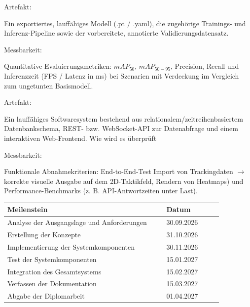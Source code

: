 Artefakt:

Ein exportiertes, lauffähiges Modell 
(.pt / .yaml), die zugehörige Trainings- und Inferenz-Pipeline 
sowie der vorbereitete, annotierte Validierungsdatensatz. 

Messbarkeit: 

Quantitative Evaluierungsmetriken: $mAP_{50}$, $mAP_{50-95}$, 
Precision, Recall und Inferenzzeit (FPS / Latenz in ms) bei 
Szenarien mit Verdeckung im Vergleich zum ungetunten Basismodell.

Artefakt:

Ein lauffähiges Softwaresystem bestehend aus 
relationalem/zeitreihenbasiertem Datenbankschema, REST- bzw. 
WebSocket-API zur Datenabfrage und einem interaktiven Web-Frontend.
Wie wird es überprüft 

Messbarkeit:

Funktionale Abnahmekriterien: End-to-End-Test 
Import von Trackingdaten $\rightarrow$ korrekte 
visuelle Ausgabe auf dem 2D-Taktikfeld, Rendern von Heatmaps) 
und Performance-Benchmarks (z. B. API-Antwortzeiten unter Last).


\begin{tabular}{@{}p{0.68\linewidth}p{0.24\linewidth}@{}}
    \toprule
    \bfseries Meilenstein & \bfseries Datum \\
    \midrule
    Analyse der Ausgangslage und Anforderungen & 30.09.2026 \\
    Erstellung der Konzepte                    & 31.10.2026 \\
    Implementierung der Systemkomponenten      & 30.11.2026 \\
    Test der Systemkomponenten                 & 15.01.2027 \\
    Integration des Gesamtsystems              & 15.02.2027 \\
    Verfassen der Dokumentation                & 15.03.2027 \\
  Abgabe der Diplomarbeit                    & 01.04.2027 \\
  \bottomrule
\end{tabular}
